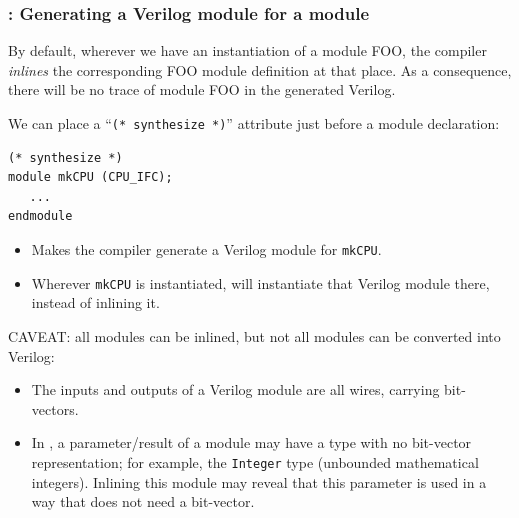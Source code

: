 \begin{frame}[fragile]
\frametitle{{\BSV}: Generating a Verilog module for a {\BSV} module}

\footnotesize

By default, wherever we have an instantiation of a module FOO, the
{\bsc} compiler \emph{inlines} the corresponding FOO module definition
at that place.  As a consequence, there will be no trace of module FOO
in the generated Verilog.

\vspace{4ex}

We can place a ``\verb|(* synthesize *)|'' attribute just before a module declaration:

\begin{Verbatim}[frame=single]
(* synthesize *)
module mkCPU (CPU_IFC);
   ...
endmodule
\end{Verbatim}

\begin{itemize}
 \item Makes the {\bsc} compiler generate a Verilog module for {\tt mkCPU}.

 \item Wherever {\tt mkCPU} is instantiated, {\bsc} will instantiate
       that Verilog module there, instead of inlining it.

\end{itemize}

\vspace{2ex}

CAVEAT: all {\BSV} modules can be inlined, but not all {\BSV} modules
can be converted into Verilog:
\begin{itemize}

 \item The inputs and outputs of a Verilog module are all wires, carrying bit-vectors.

 \item In {\BSV}, a parameter/result of a module may have a type with
       no bit-vector representation; for example, the {\tt Integer}
       type (unbounded mathematical integers).  Inlining this module
       may reveal that this parameter is used in a way that does not
       need a bit-vector.
\end{itemize}

\end{frame}


